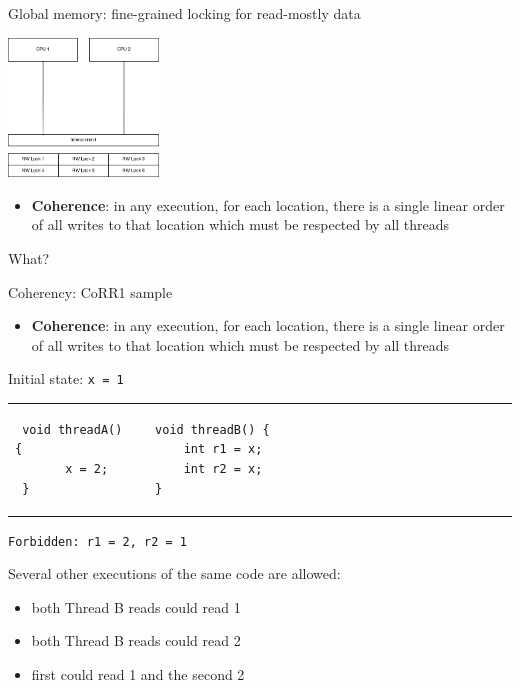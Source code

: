 \begin{frame}{Global memory: fine-grained locking for read-mostly data}

\begin{center}
  \includegraphics[width=0.3\textwidth]{./pics/processor/5.png}
\end{center}

\begin{itemize}
    \item \textbf{Coherence}: in any execution, for each location, there is a single linear order of all writes to that location which must be respected by all threads
\end{itemize}

\pause
What?

\end{frame}

\begin{frame}[t,fragile]{Coherency: CoRR1 sample}

\begin{itemize}
    \item \textbf{Coherence}: in any execution, for each location, there is a single linear order of all writes to that location which must be respected by all threads
\end{itemize}

\pause

Initial state: \texttt{x = 1}
\begin{tabular}{p{} p{}} 
 \begin{verbatim}
 void threadA() {
       x = 2;   
 }
 \end{verbatim}
 &  
 \begin{verbatim}
 void threadB() {                                   
     int r1 = x;                           
     int r2 = x;                           
 }                    
 \end{verbatim}
\end{tabular}

\pause
\texttt{Forbidden: r1 = 2, r2 = 1}

\pause
Several other executions of the same code are allowed: 
\begin{itemize}
    \item both Thread B reads could read 1
    \item both Thread B reads could read 2
    \item first could read 1 and the second 2
\end{itemize}

\end{frame}


